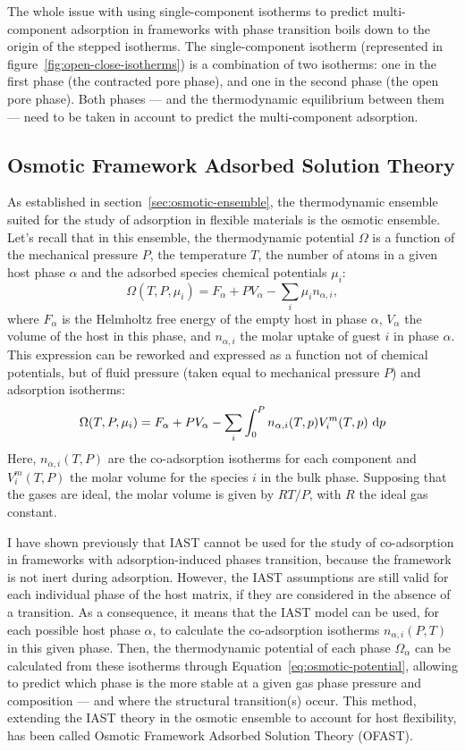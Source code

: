 \documentclass[thesis]{subfiles}
\begin{document}
The whole issue with using single-component isotherms to predict multi-component
adsorption in frameworks with phase transition boils down to the origin of the
stepped isotherms. The single-component isotherm (represented in
figure~\ref{fig:open-close-isotherms}) is a combination of two isotherms: one in
the first phase (the contracted pore phase), and one in the second phase (the
open pore phase). Both phases --- and the thermodynamic equilibrium between them
--- need to be taken in account to predict the multi-component adsorption.

\subsection{Osmotic Framework Adsorbed Solution Theory}

As established in section~\ref{sec:osmotic-ensemble}, the thermodynamic ensemble
suited for the study of adsorption in flexible materials is the osmotic
ensemble. Let's recall that in this ensemble, the thermodynamic potential
$\Omega$ is a function of the mechanical pressure $P$, the temperature $T$, the
number of atoms in a given host phase $\alpha$ and the adsorbed species chemical
potentials $\mu_i$:
\[\Omega(T, P, \mu_i) = F_\alpha + P V_\alpha - \sum_i \mu_i n_{\alpha,i},\]
where $F_\alpha$ is the Helmholtz free energy of the empty host in phase
$\alpha$, $V_\alpha$ the volume of the host in this phase, and $n_{\alpha,i}$
the molar uptake of guest $i$ in phase $\alpha$. This expression can be reworked
and expressed as a function not of chemical potentials, but of fluid pressure
(taken equal to mechanical pressure $P$) and adsorption
isotherms:\cite{Coudert2008}
\[ \label{eq:osmotic-potential}\Omega(T, P, \mu_i) = F_\alpha + P V_\alpha - \sum_i \int_0^P n_{\alpha,i}(T, p) V^m_i(T, p) \ \d p\]
Here, $n_{\alpha,i}(T,P)$ are the co-adsorption isotherms for each component and
$V^m_i(T,P)$ the molar volume for the species $i$ in the bulk phase. Supposing
that the gases are ideal, the molar volume is given by $RT/P$, with $R$ the
ideal gas constant.

I have shown previously that IAST cannot be used for the study of co-adsorption
in frameworks with adsorption-induced phases transition, because the framework
is not inert during adsorption. However, the IAST assumptions are still valid
for each individual phase of the host matrix, if they are considered in the
absence of a transition. As a consequence, it means that the IAST model can be
used, for each possible host phase $\alpha$, to calculate the co-adsorption
isotherms $n_{\alpha,i}(P,T)$ in this given phase. Then, the thermodynamic
potential of each phase $\Omega_{\alpha}$ can be calculated from these isotherms
through Equation~\eqref{eq:osmotic-potential}, allowing to predict which phase
is the more stable at a given gas phase pressure and composition --- and where
the structural transition(s) occur. This method, extending the IAST theory in
the osmotic ensemble to account for host flexibility, has been called Osmotic
Framework Adsorbed Solution Theory (OFAST)\cite{Coudert2009, Coudert2010}.
\end{document}
